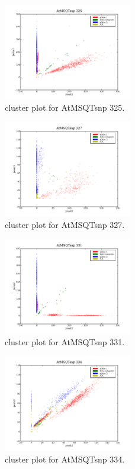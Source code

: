 \begin{figure}[H]
\includegraphics[width=0.5\textwidth]{figures/cluster_plot_AtMSQTsnp_325.png}
\caption{cluster plot for AtMSQTsnp 325.} \label{flAtMSQTsnp325}
\end{figure}
\begin{figure}[H]
\includegraphics[width=0.5\textwidth]{figures/cluster_plot_AtMSQTsnp_327.png}
\caption{cluster plot for AtMSQTsnp 327.} \label{flAtMSQTsnp327}
\end{figure}
\begin{figure}[H]
\includegraphics[width=0.5\textwidth]{figures/cluster_plot_AtMSQTsnp_331.png}
\caption{cluster plot for AtMSQTsnp 331.} \label{flAtMSQTsnp331}
\end{figure}
\begin{figure}[H]
\includegraphics[width=0.5\textwidth]{figures/cluster_plot_AtMSQTsnp_334.png}
\caption{cluster plot for AtMSQTsnp 334.} \label{flAtMSQTsnp334}
\end{figure}
